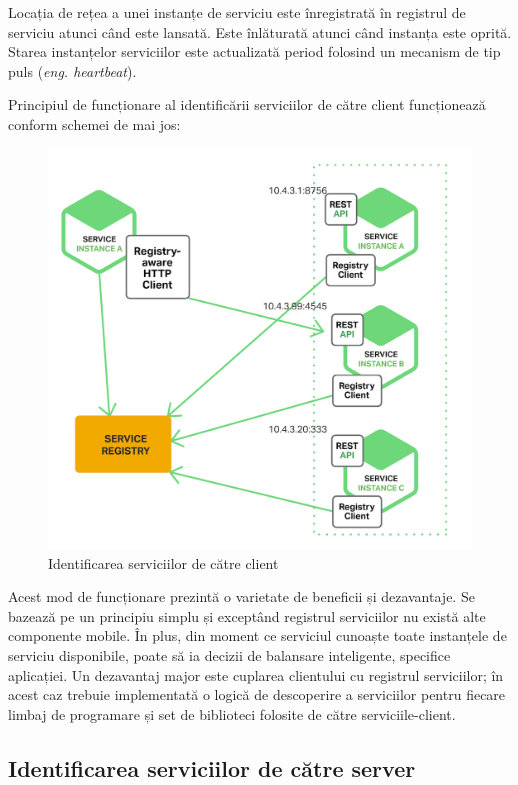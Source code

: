 \documentclass[12pt, a4paper, oneside, romanian]{teza-upb}
\begin{document}
Locația de rețea a unei instanțe de serviciu este înregistrată în registrul de serviciu atunci când este lansată. Este înlăturată atunci când instanța este oprită. Starea instanțelor serviciilor este actualizată period folosind un mecanism de tip puls (\textit{eng. heartbeat}).

Principiul de funcționare al identificării serviciilor de către client funcționează conform schemei de mai jos:

\begin{figure}[ht]
\centering
\includegraphics[scale=0.25]{img/Richardson-microservices-part4-2_client-side-pattern.png}
\caption{Identificarea serviciilor de către client}
\label{fig:arhi_componente}
\end{figure}

Acest mod de funcționare prezintă o varietate de beneficii și dezavantaje. Se bazează pe un principiu simplu și exceptând registrul serviciilor nu există alte componente mobile. În plus, din moment ce serviciul cunoaște toate instanțele de serviciu disponibile, poate să ia decizii de balansare inteligente, specifice aplicației. Un dezavantaj major este cuplarea clientului cu registrul serviciilor; în acest caz trebuie implementată o logică de descoperire a serviciilor pentru fiecare limbaj de programare și set de biblioteci folosite de către serviciile-client. 

\subsection{Identificarea serviciilor de către server}
\end{document}
